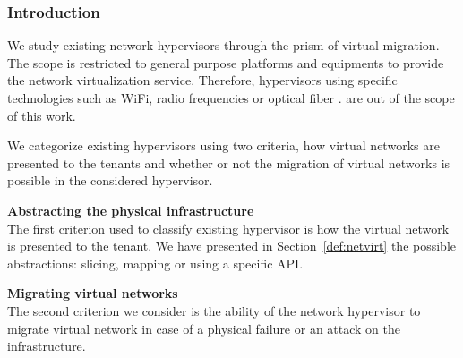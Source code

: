 \subsubsection{Introduction}
We study existing network hypervisors through the prism of virtual migration.
The scope is restricted to general purpose platforms and equipments to provide the network virtualization service. Therefore, hypervisors using specific technologies such as WiFi, radio frequencies or optical fiber \etc. are out of the scope of this work.

We categorize existing hypervisors using two criteria, how virtual networks are presented to the tenants and whether or not the migration of virtual networks is possible in the considered hypervisor.

\textbf{Abstracting the physical infrastructure\\}
The first criterion used to classify existing hypervisor is how the virtual network is presented to the tenant. We have presented in Section~\ref{def:netvirt} the possible abstractions: slicing, mapping or using a specific API. 

\textbf{Migrating virtual networks\\}
The second criterion we consider is the ability of the network hypervisor to migrate virtual network in case of a physical failure or an attack on the infrastructure.


